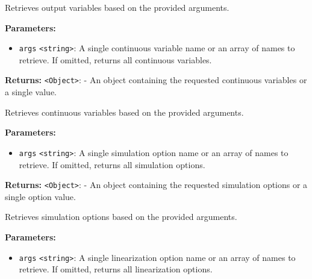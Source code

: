 \documentclass[12pt,a4paper]{article}
\begin{document}
\noindent Retrieves output variables based on the provided arguments.

\vspace{5mm}
\noindent {}


\noindent \textbf{Parameters:}
\begin{itemize}
  \item \texttt{args} \texttt{<string>}: A single continuous variable name or an array of names to retrieve. If omitted, returns all continuous variables.
\end{itemize}

\noindent \textbf{Returns:} \texttt{<Object>}: - An object containing the requested continuous variables or a single value.

\noindent Retrieves continuous variables based on the provided arguments.

\vspace{5mm}
\noindent {}


\noindent \textbf{Parameters:}
\begin{itemize}
  \item \texttt{args} \texttt{<string>}: A single simulation option name or an array of names to retrieve. If omitted, returns all simulation options.
\end{itemize}

\noindent \textbf{Returns:} \texttt{<Object>}: - An object containing the requested simulation options or a single option value.

\noindent Retrieves simulation options based on the provided arguments.

\vspace{5mm}
\noindent {}


\noindent \textbf{Parameters:}
\begin{itemize}
  \item \texttt{args} \texttt{<string>}: A single linearization option name or an array of names to retrieve. If omitted, returns all linearization options.
\end{itemize}
\end{document}
